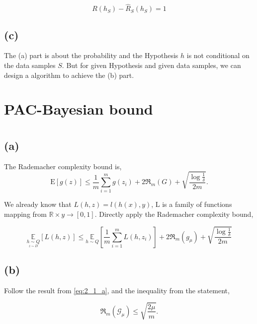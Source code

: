 \documentclass{article}
\begin{document}
\begin{equation}
  R\left(h_{S}\right)-\widehat{R}_{S}\left(h_{S}\right)=1
\end{equation}

\subsection{(c)}

The (a) part is about the probability and the Hypothesis $h$ is not conditional on the data samples $S$. But for given Hypothesis and given data samples, we can design a algorithm to achieve the (b) part.

\section*{PAC-Bayesian bound}
\section{}
\subsection{(a)}
The Rademacher complexity bound is,
\begin{equation}
  \mathrm{E}[g(z)] \leq \frac{1}{m} \sum_{i=1}^{m} g\left(z_{i}\right)+2 \Re_{m}(G)+\sqrt{\frac{\log \frac{1}{\delta}}{2 m}}.
\end{equation}

We already know that $L(h,z) = l(h(x),y)$, L is a family of functions mapping from $ \mathbb{R} \times y \to [0,1]$. Directly apply the Rademacher complexity bound,

\begin{equation}
\underset{\underset{z \sim D}{h \sim Q}}{\mathbb{E}}[L(h, z)] \leq \underset{h \sim Q}{\mathbb{E}}\left[\frac{1}{m} \sum_{i=1}^{m} L\left(h, z_{i}\right)\right]+2 \Re_{m}\left(g_{\mu}\right)+\sqrt{\frac{\log \frac{1}{\delta}}{2 m}} \label{eq:2_1_a}
\end{equation}

\subsection{(b)}

Follow the result from \eqref{eq:2_1_a}, and the inequality from the statement,

\begin{equation}
  \mathfrak{R}_{m}\left(\mathcal{G}_{\mu}\right) \leq \sqrt{\frac{2 \mu}{m}}.
\end{equation}
\end{document}
